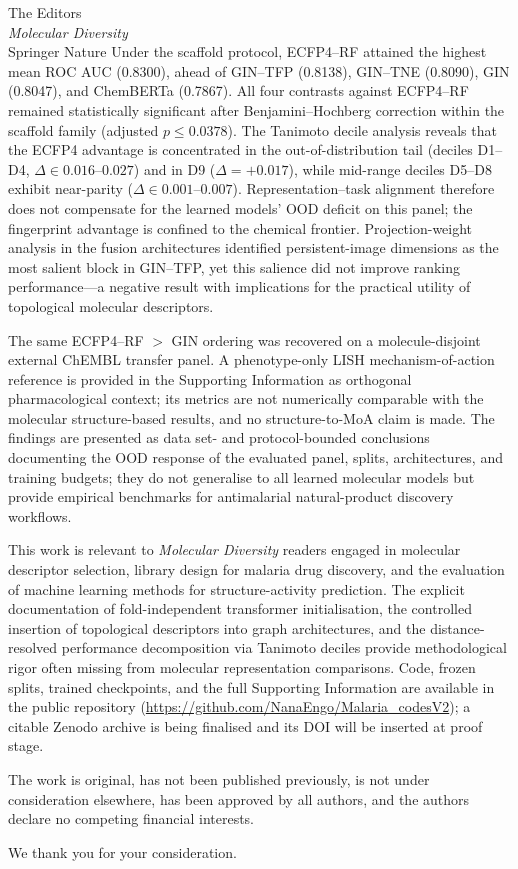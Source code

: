 \documentclass[11pt,a4paper]{letter}
\begin{document}
\begin{letter}{%
  The Editors \\
  \textit{Molecular Diversity} \\
  Springer Nature
}
Under the scaffold protocol, ECFP4--RF attained the highest mean ROC AUC (\num{0.8300}), ahead of GIN--TFP (\num{0.8138}), GIN--TNE (\num{0.8090}), GIN (\num{0.8047}), and ChemBERTa (\num{0.7867}). All four contrasts against ECFP4--RF remained statistically significant after Benjamini--Hochberg correction within the scaffold family (adjusted $p \le \num{0.0378}$). The Tanimoto decile analysis reveals that the ECFP4 advantage is concentrated in the out-of-distribution tail (deciles D\num{1}--D\num{4}, $\Delta \in \numrange{0.016}{0.027}$) and in D\num{9} ($\Delta = +\num{0.017}$), while mid-range deciles D\num{5}--D\num{8} exhibit near-parity ($\Delta \in \numrange{0.001}{0.007}$). Representation--task alignment therefore does not compensate for the learned models' OOD deficit on this panel; the fingerprint advantage is confined to the chemical frontier. Projection-weight analysis in the fusion architectures identified persistent-image dimensions as the most salient block in GIN--TFP, yet this salience did not improve ranking performance---a negative result with implications for the practical utility of topological molecular descriptors.

The same ECFP4--RF $>$ GIN ordering was recovered on a molecule-disjoint external ChEMBL transfer panel. A phenotype-only LISH mechanism-of-action reference is provided in the Supporting Information as orthogonal pharmacological context; its metrics are not numerically comparable with the molecular structure-based results, and no structure-to-MoA claim is made. The findings are presented as data set- and protocol-bounded conclusions documenting the OOD response of the evaluated panel, splits, architectures, and training budgets; they do not generalise to all learned molecular models but provide empirical benchmarks for antimalarial natural-product discovery workflows.

This work is relevant to \textit{Molecular Diversity} readers engaged in molecular descriptor selection, library design for malaria drug discovery, and the evaluation of machine learning methods for structure-activity prediction. The explicit documentation of fold-independent transformer initialisation, the controlled insertion of topological descriptors into graph architectures, and the distance-resolved performance decomposition via Tanimoto deciles provide methodological rigor often missing from molecular representation comparisons. Code, frozen splits, trained checkpoints, and the full Supporting Information are available in the public repository (\url{https://github.com/NanaEngo/Malaria_codesV2}); a citable Zenodo archive is being finalised and its DOI will be inserted at proof stage.

The work is original, has not been published previously, is not under consideration elsewhere, has been approved by all authors, and the authors declare no competing financial interests.

\closing{We thank you for your consideration.}

\end{letter}
\end{document}
